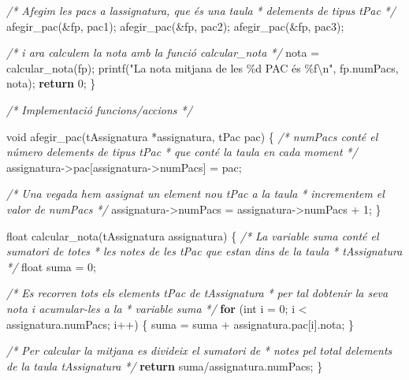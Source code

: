 \documentclass[
]{book}
\newenvironment{Shaded}{\begin{snugshade}}{\end{snugshade}}
\newcommand{\CommentTok}[1]{\textcolor[rgb]{0.56,0.35,0.01}{\textit{#1}}}
\newcommand{\ControlFlowTok}[1]{\textcolor[rgb]{0.13,0.29,0.53}{\textbf{#1}}}
\newcommand{\DataTypeTok}[1]{\textcolor[rgb]{0.13,0.29,0.53}{#1}}
\newcommand{\DecValTok}[1]{\textcolor[rgb]{0.00,0.00,0.81}{#1}}
\newcommand{\NormalTok}[1]{#1}
\newcommand{\SpecialCharTok}[1]{\textcolor[rgb]{0.00,0.00,0.00}{#1}}
\newcommand{\StringTok}[1]{\textcolor[rgb]{0.31,0.60,0.02}{#1}}
\begin{document}
\begin{Shaded}
\begin{Highlighting}[]
    \CommentTok{/* Afegim les pacs a l\textquotesingle{}assignatura, que és una taula}
\CommentTok{     * d\textquotesingle{}elements de tipus tPac }
\CommentTok{     */}
\NormalTok{    afegir\_pac(\&fp, pac1);}
\NormalTok{    afegir\_pac(\&fp, pac2);}
\NormalTok{    afegir\_pac(\&fp, pac3);}

    \CommentTok{/* i ara calculem la nota amb la funció calcular\_nota */}
\NormalTok{    nota = calcular\_nota(fp);}
\NormalTok{    printf(}\StringTok{"La nota mitjana de les \%d PAC és \%f}\SpecialCharTok{\textbackslash{}n}\StringTok{"}\NormalTok{, fp.numPacs, nota);}
    \ControlFlowTok{return} \DecValTok{0}\NormalTok{;}
\NormalTok{\}}

\CommentTok{/* Implementació funcions/accions */}

\DataTypeTok{void}\NormalTok{ afegir\_pac(tAssignatura *assignatura, tPac pac) \{}
    \CommentTok{/* numPacs conté el número d\textquotesingle{}elements de tipus tPac}
\CommentTok{     * que conté la taula en cada moment }
\CommentTok{     */}
\NormalTok{    assignatura{-}\textgreater{}pac[assignatura{-}\textgreater{}numPacs] = pac;}

    \CommentTok{/* Una vegada hem assignat un element nou tPac a la taula}
\CommentTok{     * incrementem el valor de numPacs }
\CommentTok{     */}
\NormalTok{    assignatura{-}\textgreater{}numPacs = assignatura{-}\textgreater{}numPacs + }\DecValTok{1}\NormalTok{;}
\NormalTok{\}}

\DataTypeTok{float}\NormalTok{ calcular\_nota(tAssignatura assignatura) \{}
    \CommentTok{/* La variable suma conté el sumatori de totes}
\CommentTok{     * les notes de les tPac que estan dins de la taula}
\CommentTok{     * tAssignatura }
\CommentTok{     */}
    \DataTypeTok{float}\NormalTok{ suma = }\DecValTok{0}\NormalTok{;}

    \CommentTok{/* Es recorren tots els elements tPac de tAssignatura}
\CommentTok{     * per tal d\textquotesingle{}obtenir la seva nota i acumular{-}les a la}
\CommentTok{     * variable suma }
\CommentTok{     */}
    \ControlFlowTok{for}\NormalTok{ (}\DataTypeTok{int}\NormalTok{ i = }\DecValTok{0}\NormalTok{; i \textless{} assignatura.numPacs; i++) \{}
\NormalTok{        suma = suma + assignatura.pac[i].nota;}
\NormalTok{    \}}

    \CommentTok{/* Per calcular la mitjana es divideix el sumatori de}
\CommentTok{     * notes pel total d\textquotesingle{}elements de la taula tAssignatura }
\CommentTok{     */}
    \ControlFlowTok{return}\NormalTok{ suma/assignatura.numPacs;}
\NormalTok{\}}
\end{Highlighting}
\end{Shaded}
\end{document}
